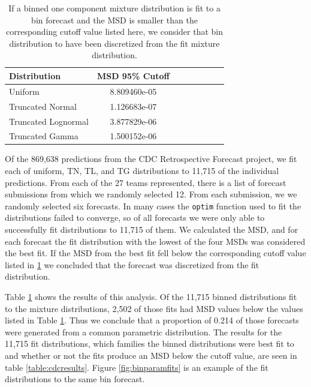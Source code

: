 \documentclass[11pt,notitlepage]{isuthesis}
\begin{document}
\begin{table}[h!]
  \centering
  \begin{tabular}{l*{6}{c}r}
  Distribution          & MSD 95\% Cutoff \\
  \hline
  Uniform               & 8.809460e-05   \\
  Truncated Normal      & 1.126683e-07  \\
  Truncated Lognormal   & 3.877829e-06  \\
  Truncated Gamma       & 1.500152e-06  \\
  \end{tabular}
  \begin{center}
\begin{minipage}{10cm}
\captionsetup{font=scriptsize}
  \caption[Bin distribution cutoff values]{If a binned 
  one component mixture distribution is fit to a bin forecast
  and the MSD is smaller than
  the corresponding cutoff value listed here, we consider that bin 
  distribution to have been discretized from the fit mixture distribution.}
  \label{table:bincutoffs}
  \end{minipage}
  \end{center}
\end{table}




Of the 869,638 predictions from the CDC Retrospective Forecast project, we fit
each of uniform, TN, TL, and TG distributions to 11,715 of the individual 
predictions. From each of the 27 teams represented, there is a list of forecast
submissions from which we randomly selected 12. From each submission, we 
we randomly selected six forecasts.
In many cases the \texttt{optim} function used to fit the 
distributions failed to converge, so of all forecasts we were only able to 
successfully fit distributions to 11,715 of them.
We calculated the MSD, and for each forecast the fit
distribution with the lowest of the four MSDs was considered the best fit. If 
the MSD from the best fit fell
below the corresponding cutoff value listed in \ref{table:bincutoffs} we 
concluded that 
the forecast was discretized from the fit distribution. 

Table \ref{table:bincutoffs} shows the results of this analysis. 
Of the 11,715 binned distributions fit to the mixture distributions,
2,502 of those fits had MSD values below the values listed in Table
\ref{table:bincutoffs}. Thus we conclude that a proportion of 0.214 of those
forecasts were generated from a common parametric distribution. The results for 
the
11,715 fit distributions, which families the binned distributions were best
fit to and whether or not the fits produce an MSD below the cutoff value, 
are seen in table \ref{table:cdcresults}. Figure \ref{fig:binparamfits} is an
example of
the fit distributions to the same bin forecast.
\end{document}
